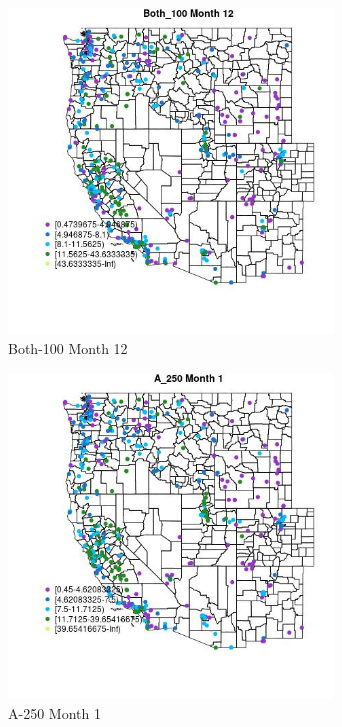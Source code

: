 \begin{figure} 
\centering  
\includegraphics[width=0.77\textwidth]{Code_Outputs/ML_input_report_ML_input_PM25_Step5_part_d_de_duplicated_aves_ML_input_MapObsMo12Both_100.jpg} 
\caption{\label{fig:ML_input_report_ML_input_PM25_Step5_part_d_de_duplicated_aves_ML_inputMapObsMo12Both_100}Both-100 Month 12} 
\end{figure} 
 

\begin{figure} 
\centering  
\includegraphics[width=0.77\textwidth]{Code_Outputs/ML_input_report_ML_input_PM25_Step5_part_d_de_duplicated_aves_ML_input_MapObsMo1A_250.jpg} 
\caption{\label{fig:ML_input_report_ML_input_PM25_Step5_part_d_de_duplicated_aves_ML_inputMapObsMo1A_250}A-250 Month 1} 
\end{figure} 
 

